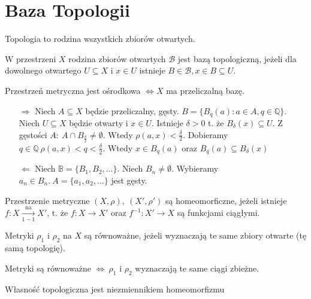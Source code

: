 \section{Baza Topologii} 
Topologia to rodzina wszystkich zbiorów otwartych. 
\begin{df} W przestrzeni $X$ rodzina zbiorów otwartych $\mathcal{B}$ jest bazą topologiczną, jeżeli dla dowolnego otwartego $U \subseteq X$ i $x \in U$ istnieje $B \in \mathcal{B}, x \in B \subseteq U$. \end{df}
\begin{tw} Przestrzeń metryczna jest ośrodkowa $\Leftrightarrow X$ ma przeliczalną bazę. \end{tw}
\begin{dd}\hfill 
    \begin{itemize} 
        \item[$\Rightarrow$] Niech $A \subseteq X$ będzie przeliczalny, gęsty. 
            $B = \{B_q(a): a \in A, q \in \mathbb{Q}\}$. Niech $U \subseteq X$ będzie otwarty i $x \in U$.
            Istnieje $\delta > 0$ t. że $B_\delta(x) \subseteq U$. 
            Z gęstości $A: \ A \cap B_{\frac{\delta}{2}} \neq \emptyset$. Wtedy 
            $\rho(a,x) < \frac{\delta}{2}$. Dobieramy $q \in \mathbb{Q} \ \rho(a,x) < q < \frac{\delta}{2}$. Wtedy 
            $x \in B_q(a)$ oraz $B_q(a) \subseteq B_\delta (x)$
        \item[$\Leftarrow$] Niech $\mathbb{B} = \{ B_1,B_2,\ldots\}$\footnotemark. Niech $B_n \neq \emptyset$. Wybieramy $a_n \in B_n.\ A = \{a_1,a_2,\ldots\}$ jest gęsty. 
    \end{itemize} 
\end{dd} 

\begin{df} Przestrzenie metryczne $(X,\rho), \ (X',\rho')$ są homeomorficzne, jeżeli istnieje $f: X \xrightarrow[1-1]{\text{na}} X'$, t. że
$f: X \rightarrow X'$ oraz $f^{-1}: X' \rightarrow X$ są funkcjami ciągłymi.\end{df}

\begin{df} Metryki $\rho_1$ i $\rho_2$ na $X$ są równoważne, jeżeli wyznaczają te same zbiory otwarte (tę samą topologię). \end{df} 
\begin{tw} Metryki są równoważne $\Leftrightarrow \ \rho_1$ i $\rho_2$ wyznaczają te same ciągi zbieżne. \end{tw}
\begin{ozn} Własność topologiczna jest niezmiennikiem homeomorfizmu \end{ozn}


